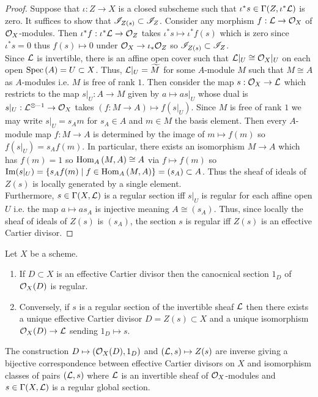 \documentclass[12pt]{article}
\begin{document}
\begin{proof}
Suppose that $\iota : Z \to X$ is a closed subscheme such that $\iota^* s \in \Gamma(Z, \iota^* \mathcal{L})$ is zero. It suffices to show that $\mathscr{I}_{Z(s)} \subset \mathscr{I}_{Z}$. 
Consider any morphism $f : \mathcal{L} \to \mathcal{O}_{X}$ of $\mathcal{O}_{X}$-modules. Then $\iota^* f : \iota^* \mathcal{L} \to \mathcal{O}_{Z}$ takes $\iota^* s \mapsto \iota^* f(s)$ which is zero since $\iota^* s = 0$ thus $f(s) \mapsto 0$ under $\mathcal{O}_{X} \to \iota_* \mathcal{O}_{Z}$ so $\mathscr{I}_{Z(s)} \subset \mathscr{I}_{Z}$.
\bigskip\\
Since $\mathcal{L}$ is invertible, there is an affine open cover such that $\mathcal{L} |_U \cong \mathcal{O}_{X} |_U$ on each open $\mathrm{Spec}\left( A \right) = U \subset X$. Thus, $\mathcal{L}|_U = \widetilde{M}$ for some $A$-module $M$ such that $M \cong A$ as $A$-modules i.e. $M$ is free of rank $1$. Then consider the map $s : \mathcal{O}_{X} \to \mathcal{L}$ which restricts to the map $s |_U : A \to M$ given by $a \mapsto a s|_U$ whose dual is $s |_U : \mathcal{L}^{\otimes - 1} \to \mathcal{O}_{X}$ takes $(f : M \to A) \mapsto f(s|_U)$. Since $M$ is free of rank $1$ we may write $s|_U = s_A m$ for $s_A \in A$ and $m \in M$ the basis element. Then every $A$-module map $f : M \to A$ is determined by the image of $m \mapsto f(m)$ so $f(s|_U) = s_A f(m)$. In particular, there exists an isomorphism $M \to A$ which has $f(m) = 1$ so $\mathrm{Hom}_{A} \left( M, A \right) \cong A$ via $f \mapsto f(m)$ so $\mathrm{Im}(s|_U) = \{s_A f(m) \mid f \in \mathrm{Hom}_{A} \left( M, A \right) \} = (s_A) \subset A$. Thus the sheaf of ideals of $Z(s)$ is locally generated by a single element.
\bigskip\\
Furthermore, $s \in \Gamma(X, \mathcal{L})$ is a regular section iff $s|_U$ is regular for each affine open $U$ i.e. the map $a \mapsto a s_A$ is injective meaning $A \cong (s_A)$. Thus, since locally the sheaf of ideals of $Z(s)$ is $(s_A)$, the section $s$ is regular iff $Z(s)$ is an effective Cartier divisor. 
\end{proof}

\begin{theorem}
Let $X$ be a scheme. 
\begin{enumerate}
\item If $D \subset X$ is an effective Cartier divisor then the canocnical section $1_D$ of $\mathcal{O}_{X}(D)$ is regular.
\item Conversely, if $s$ is a regular section of the invertible sheaf $\mathcal{L}$ then there exists a unique effective Cartier divisor $D = Z(s) \subset X$ and a unique isomorphism $\mathcal{O}_{X}(D) \to \mathcal{L}$ sending $1_D \mapsto s$. 
\end{enumerate}
The construction $D \mapsto (\mathcal{O}_{X}(D), 1_D)$ and $(\mathcal{L}, s) \mapsto Z(s)$ are inverse giving a bijective correspondence between effective Cartier divisors on $X$ and isomorphism classes of pairs $(\mathcal{L}, s)$ where $\mathcal{L}$ is an invertible sheaf of $\mathcal{O}_{X}$-modules and $s \in \Gamma(X, \mathcal{L})$ is a regular global section. 
\end{theorem}
\end{document}
